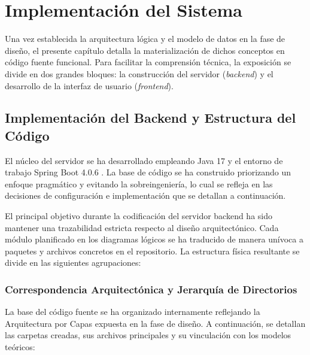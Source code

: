 \newpage
\section{Implementación del Sistema}

Una vez establecida la arquitectura lógica y el modelo de datos en la fase de diseño, el presente capítulo detalla la materialización de dichos conceptos en código fuente funcional. Para facilitar la comprensión técnica, la exposición se divide en dos grandes bloques: la construcción del servidor (\textit{backend}) y el desarrollo de la interfaz de usuario (\textit{frontend}).

\subsection{Implementación del Backend y Estructura del Código}

El núcleo del servidor se ha desarrollado empleando Java 17 \cite{bib:java} y el entorno de trabajo Spring Boot 4.0.6 \cite{bib:springboot}. La base de código se ha construido priorizando un enfoque pragmático y evitando la sobreingeniería, lo cual se refleja en las decisiones de configuración e implementación que se detallan a continuación.

El principal objetivo durante la codificación del servidor backend ha sido mantener una trazabilidad estricta respecto al diseño arquitectónico. Cada módulo planificado en los diagramas lógicos se ha traducido de manera unívoca a paquetes y archivos concretos en el repositorio. La estructura física resultante se divide en las siguientes agrupaciones:

\subsubsection{Correspondencia Arquitectónica y Jerarquía de Directorios}

La base del código fuente se ha organizado internamente reflejando la Arquitectura por Capas expuesta en la fase de diseño. A continuación, se detallan las carpetas creadas, sus archivos principales y su vinculación con los modelos teóricos:

